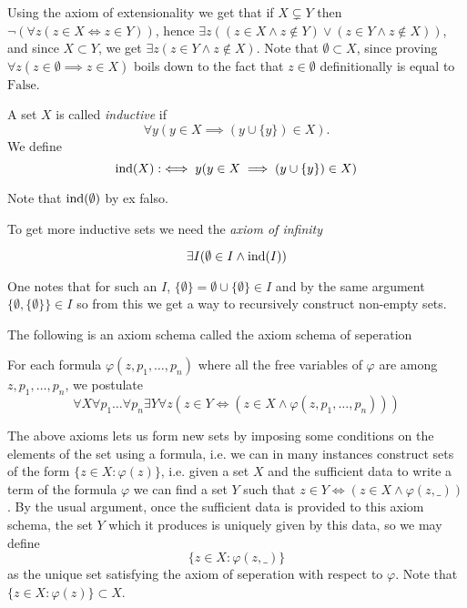 \begin{remark}
    Using the axiom of extensionality we get that if $X\subsetneq Y$ then $\neg(\forall z(z\in X\iff z\in Y))$, hence $\exists z((z\in X\wedge z\notin Y) \vee (z\in Y \wedge z\notin X))$, and since $X\subset Y$, we get $\exists z(z\in Y \wedge z\notin X)$. Note that $\emptyset \subset X$, since proving $\forall z(z\in \emptyset \implies z\in X)$ boils down to the fact that $z\in \emptyset$ definitionally is equal to $\mathrm{False}$.
\end{remark}
\begin{definition}
    A set $X$ is called \textit{inductive} if 
    $$\forall y(y\in X \implies (y\cup \{y\})\in X).$$
    We define 
    $$\mathrm{ind}(X) :\iff y(y\in X \implies (y\cup \{y\})\in X)$$
\end{definition}
\begin{example}
    Note that $\mathrm{ind}(\emptyset)$ by ex falso.
\end{example}
To get more inductive sets we need the \textit{axiom of infinity}
\begin{axioms}
    $$\exists I(\emptyset \in I \wedge \mathrm{ind}(I))$$
\end{axioms}
\begin{remark}
    One notes that for such an $I$, $\{\emptyset\}=\emptyset \cup \{\emptyset\}\in I$ and by the same argument $\{\emptyset,\{\emptyset\}\}\in I$ so from this we get a way to recursively construct non-empty sets. 
\end{remark}
The following is an axiom schema called the axiom schema of seperation
\begin{axioms}
    For each formula $\varphi(z,p_1,\dots,p_n)$ where all the free variables of $\varphi$ are among $z,p_1,\dots, p_n$, we postulate 
    $$\forall X\forall p_1\dots \forall p_n\exists Y\forall z(z\in Y\iff (z\in X\wedge \varphi(z,p_1,\dots,p_n)))$$
\end{axioms}
The above axioms lets us form new sets by imposing some conditions on the elements of the set using a formula, i.e. we can in many instances construct sets of the form $\{z\in X: \varphi(z)\}$, i.e. given a set $X$ and the sufficient data to write a term of the formula $\varphi$ we can find a set $Y$ such that $z\in Y \iff  (z \in X \wedge \varphi(z,\_))$. By the usual argument, once the sufficient data is provided to this axiom schema, the set $Y$ which it produces is uniquely given by this data, so we may define 
$$\{z\in X : \varphi(z,\_)\}$$
as the unique set satisfying the axiom of seperation with respect to $\varphi$. Note that $\{z\in X : \varphi(z)\}\subset X$.
